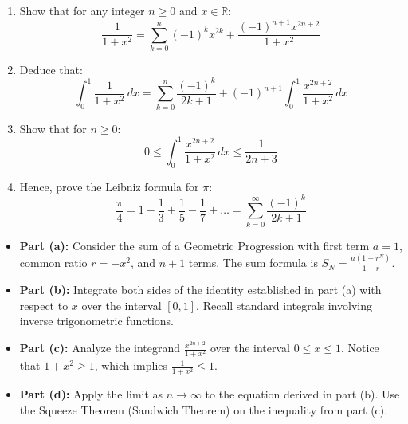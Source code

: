 \begin{problem}


\begin{enumerate}
    \item[(a)] Show that for any integer $n \ge 0$ and $x \in \mathbb{R}$:
    \[
    \frac{1}{1+x^2} = \sum_{k=0}^{n} (-1)^k x^{2k} + \frac{(-1)^{n+1}x^{2n+2}}{1+x^2}
    \]

    \item[(b)] Deduce that:
    \[
    \int_{0}^{1} \frac{1}{1+x^2} \, dx = \sum_{k=0}^{n} \frac{(-1)^k}{2k+1} + (-1)^{n+1} \int_{0}^{1} \frac{x^{2n+2}}{1+x^2} \, dx
    \]

    \item[(c)] Show that for $n \ge 0$:
    \[
    0 \le \int_{0}^{1} \frac{x^{2n+2}}{1+x^2} \, dx \le \frac{1}{2n+3}
    \]

    \item[(d)] Hence, prove the Leibniz formula for $\pi$:
    \[
    \frac{\pi}{4} = 1 - \frac{1}{3} + \frac{1}{5} - \frac{1}{7} + \dots = \sum_{k=0}^{\infty} \frac{(-1)^k}{2k+1}
    \]
\end{enumerate}

\end{problem}

\begin{hint}
\begin{itemize}
    \item \textbf{Part (a):} Consider the sum of a Geometric Progression with first term $a=1$, common ratio $r = -x^2$, and $n+1$ terms. The sum formula is $S_N = \frac{a(1-r^N)}{1-r}$.
    \item \textbf{Part (b):} Integrate both sides of the identity established in part (a) with respect to $x$ over the interval $[0, 1]$. Recall standard integrals involving inverse trigonometric functions.
    \item \textbf{Part (c):} Analyze the integrand $\frac{x^{2n+2}}{1+x^2}$ over the interval $0 \le x \le 1$. Notice that $1+x^2 \ge 1$, which implies $\frac{1}{1+x^2} \le 1$.
    \item \textbf{Part (d):} Apply the limit as $n \to \infty$ to the equation derived in part (b). Use the Squeeze Theorem (Sandwich Theorem) on the inequality from part (c).
\end{itemize}
\end{hint}


